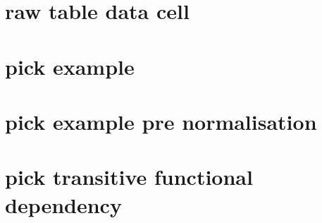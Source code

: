 \documentclass[10pt,a4paper]{article}
\begin{document}
\section{raw table data cell}


\section{pick example}


\section{pick example pre normalisation}


\section{pick transitive functional dependency}

	 
\end{document}
